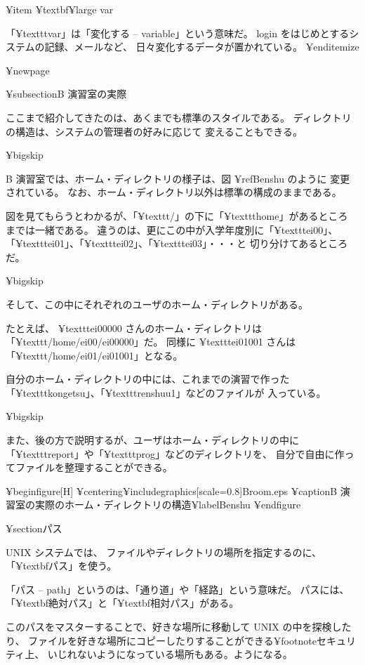 ¥item ¥textbf{¥large var}

「¥texttt{var}」は「変化する -- variable」という意味だ。
 login をはじめとするシステムの記録、メールなど、
日々変化するデータが置かれている。
¥end{itemize}

¥newpage

¥subsection{B 演習室の実際}

ここまで紹介してきたのは、あくまでも標準のスタイルである。
ディレクトリの構造は、システムの管理者の好みに応じて
変えることもできる。

¥bigskip

B 演習室では、ホーム・ディレクトリの様子は、図 ¥ref{Benshu} のように
変更されている。
なお、ホーム・ディレクトリ以外は標準の構成のままである。

図を見てもらうとわかるが、「¥texttt{/}」の下に「¥texttt{home}」があるところ
までは一緒である。
違うのは、更にこの中が入学年度別に「¥texttt{ei00}」、
「¥texttt{ei01}」、「¥texttt{ei02}」、「¥texttt{ei03}」・・・と
切り分けてあるところだ。

¥bigskip

そして、この中にそれぞれのユーザのホーム・ディレクトリがある。

たとえば、 ¥texttt{ei00000} さんのホーム・ディレクトリは
「¥texttt{/home/ei00/ei00000}」だ。
同様に ¥texttt{ei01001} さんは「¥texttt{/home/ei01/ei01001}」となる。

自分のホーム・ディレクトリの中には、これまでの演習で作った
「¥texttt{kongetsu}」、「¥texttt{renshuu1}」などのファイルが
入っている。

¥bigskip

また、後の方で説明するが、ユーザはホーム・ディレクトリの中に
「¥texttt{report}」や「¥texttt{prog}」などのディレクトリを、
自分で自由に作ってファイルを整理することができる。

¥begin{figure}[H]
¥centering{¥includegraphics[scale=0.8]{Broom.eps}}
¥caption{B 演習室の実際のホーム・ディレクトリの構造}¥label{Benshu}
¥end{figure}

¥section{パス}

 UNIX システムでは、
ファイルやディレクトリの場所を指定するのに、
「¥textbf{パス}」を使う。

「パス -- path」というのは、「通り道」や「経路」という意味だ。
パスには、「¥textbf{絶対パス}」と「¥textbf{相対パス}」がある。

このパスをマスターすることで、好きな場所に移動して UNIX の中を探検したり、
ファイルを好きな場所にコピーしたりすることができる¥footnote{セキュリティ上、
いじれないようになっている場所もある。}ようになる。

